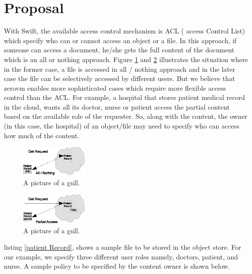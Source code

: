 \section{Proposal}

With Swift, the available access control mechanism is  ACL ( access Control List) which specify who can or cannot access an object or a file. In this approach, if someone can access a document, he/she gets the full content of the document which is an all or nothing approach.  Figure \ref{fig:swiftfile} and \ref{fig:zwiftfile}  illustrates the situation where in the former case, a file is accessed in all / nothing approach and in the later case the file can be selectively accessed by different users. But we believe that   zerovm enables more sophisticated cases which require more flexible access control than the ACL. For example,  a hospital that stores patient medical record in the cloud,  wants all its doctor, nurse or patient access the partial content based on the available role of the requester.  So, along with the content, the owner (in this case, the hospital) of an object/file may need to specify who can access how much of the content.

\begin{figure}[h!] 
  \centering
    \includegraphics[width=0.3\textwidth]{eps/swift_file}
 \caption{A picture of a gull.}
\label{fig:swiftfile}
\end{figure}

\begin{figure}[h!]
  \centering
    \includegraphics[width=0.3\textwidth]{eps/zwift_file}
 \caption{A picture of a gull.}
\label {fig:zwiftfile} 
\end{figure}




listing \ref{patient Record}, shows a sample file to be stored in the object store. For our example, we specify three different user roles namely, doctors, patient, and nurse.
A sample policy to be specified by the content owner is shown below.


